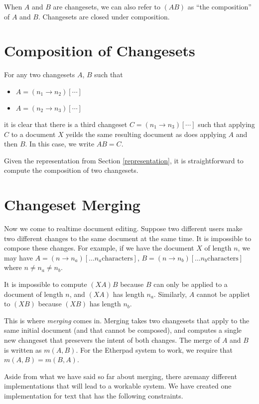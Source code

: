 \documentclass{article}
\begin{document}
When $A$ and $B$ are changesets, we can also refer to $(AB)$ as ``the composition'' of $A$ and $B$.  Changesets are closed under composition.

\section{Composition of Changesets}

For any two changesets $A$, $B$ such that

\begin{itemize}
\item[] $A=(n_1\rightarrow n_2)[\cdots]$
\item[] $A=(n_2\rightarrow n_3)[\cdots]$
\end{itemize}
it is clear that there is a third changeset $C=(n_1\rightarrow n_3)[\cdots]$ such that applying $C$ to a document $X$ yeilds the same resulting document as does applying $A$ and then $B$.  In this case, we write $AB=C$.

Given the representation from Section \ref{representation}, it is straightforward to compute the composition of two changesets.

\section{Changeset Merging}

Now we come to realtime document editing.  Suppose two different users make two different changes to the same document at the same time.  It is impossible to compose these changes.    For example, if we have the document $X$ of length $n$, we may have $A=(n\rightarrow n_a)[\ldots n_a \mathrm{characters}]$,  $B=(n\rightarrow n_b)[\ldots n_b \mathrm{characters}]$ where $n\neq n_a\neq n_b$.

It is impossible to compute $(XA)B$ because $B$ can only be applied to a document of length $n$, and $(XA)$ has length $n_a$.  Similarly, $A$ cannot be appliet to $(XB)$ because $(XB)$ has length $n_b$.

This is where \emph{merging} comes in.  Merging takes two changesets that apply to the same initial document (and that cannot be composed), and computes a single new changeset that presevers the intent of both changes.  The merge of $A$ and $B$ is written as $m(A,B)$.  For the Etherpad system to work, we require that $m(A,B)=m(B,A)$.

Aside from what we have said so far about merging, there aremany different implementations that will lead to a workable system.  We have created one implementation for text that has the following constraints.
\end{document}
